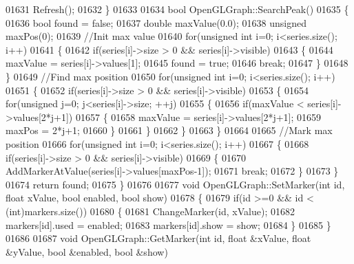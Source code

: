 \begin{DoxyCode}
{{{{{{{{{{{{{{{{01631     Refresh();
01632 \}
01633 
01634 \textcolor{keywordtype}{bool} OpenGLGraph::SearchPeak()
01635 \{
01636     \textcolor{keywordtype}{bool} found = \textcolor{keyword}{false};
01637     \textcolor{keywordtype}{double} maxValue(0.0);
01638     \textcolor{keywordtype}{unsigned} maxPos(0);
01639     \textcolor{comment}{//Init max value}
01640     \textcolor{keywordflow}{for}(\textcolor{keywordtype}{unsigned} \textcolor{keywordtype}{int} i=0; i<series.size(); i++)
01641     \{
01642         \textcolor{keywordflow}{if}(series[i]->size > 0 && series[i]->visible)
01643         \{
01644             maxValue = series[i]->values[1];
01645             found = \textcolor{keyword}{true};
01646             \textcolor{keywordflow}{break};
01647         \}
01648     \}
01649     \textcolor{comment}{//Find max position}
01650     \textcolor{keywordflow}{for}(\textcolor{keywordtype}{unsigned} \textcolor{keywordtype}{int} i=0; i<series.size(); i++)
01651     \{
01652         \textcolor{keywordflow}{if}(series[i]->size > 0 && series[i]->visible)
01653         \{
01654             \textcolor{keywordflow}{for}(\textcolor{keywordtype}{unsigned} j=0; j<series[i]->size; ++j)
01655             \{
01656                 \textcolor{keywordflow}{if}(maxValue < series[i]->values[2*j+1])
01657                 \{
01658                     maxValue = series[i]->values[2*j+1];
01659                     maxPos = 2*j+1;
01660                 \}
01661             \}
01662         \}
01663     \}
01664 
01665     \textcolor{comment}{//Mark max position}
01666     \textcolor{keywordflow}{for}(\textcolor{keywordtype}{unsigned} \textcolor{keywordtype}{int} i=0; i<series.size(); i++)
01667     \{
01668         \textcolor{keywordflow}{if}(series[i]->size > 0 && series[i]->visible)
01669         \{
01670             AddMarkerAtValue(series[i]->values[maxPos-1]);
01671             \textcolor{keywordflow}{break};
01672         \}
01673     \}
01674     \textcolor{keywordflow}{return} found;
01675 \}
01676 
01677 \textcolor{keywordtype}{void} OpenGLGraph::SetMarker(\textcolor{keywordtype}{int} \textcolor{keywordtype}{id}, \textcolor{keywordtype}{float} xValue, \textcolor{keywordtype}{bool} enabled, \textcolor{keywordtype}{bool} show)
01678 \{
01679     \textcolor{keywordflow}{if}(\textcolor{keywordtype}{id} >=0 && \textcolor{keywordtype}{id} < (\textcolor{keywordtype}{int})markers.size())
01680     \{
01681         ChangeMarker(\textcolor{keywordtype}{id}, xValue);
01682         markers[id].used = enabled;
01683         markers[id].show = show;
01684     \}
01685 \}
01686 
01687 \textcolor{keywordtype}{void} OpenGLGraph::GetMarker(\textcolor{keywordtype}{int} \textcolor{keywordtype}{id}, \textcolor{keywordtype}{float} &xValue, \textcolor{keywordtype}{float} &yValue, \textcolor{keywordtype}{bool} &enabled, \textcolor{keywordtype}{bool} &show)
}}}}}}}}}}}}}}}}
\end{DoxyCode}
